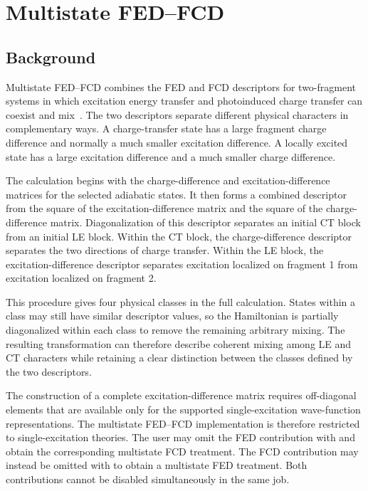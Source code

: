 \section{Multistate FED--FCD}\label{sec-fedfcd}
\subsection{Background}
Multistate FED--FCD combines the FED and FCD descriptors for two-fragment systems in which excitation energy transfer and photoinduced charge transfer can coexist and mix~\cite{Nottoli-PR-2018-p215}. The two descriptors separate different physical characters in complementary ways. A charge-transfer state has a large fragment charge difference and normally a much smaller excitation difference. A locally excited state has a large excitation difference and a much smaller charge difference.

The calculation begins with the charge-difference and excitation-difference matrices for the selected adiabatic states. It then forms a combined descriptor from the square of the excitation-difference matrix and the square of the charge-difference matrix. Diagonalization of this descriptor separates an initial CT block from an initial LE block. Within the CT block, the charge-difference descriptor separates the two directions of charge transfer. Within the LE block, the excitation-difference descriptor separates excitation localized on fragment 1 from excitation localized on fragment 2.

This procedure gives four physical classes in the full calculation. States within a class may still have similar descriptor values, so the Hamiltonian is partially diagonalized within each class to remove the remaining arbitrary mixing. The resulting transformation can therefore describe coherent mixing among LE and CT characters while retaining a clear distinction between the classes defined by the two descriptors.

The construction of a complete excitation-difference matrix requires off-diagonal elements that are available only for the supported single-excitation wave-function representations. The multistate FED--FCD implementation is therefore restricted to single-excitation theories. The user may omit the FED contribution with  and obtain the corresponding multistate FCD treatment. The FCD contribution may instead be omitted with  to obtain a multistate FED treatment. Both contributions cannot be disabled simultaneously in the same job.

